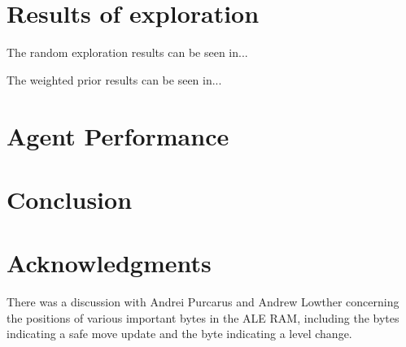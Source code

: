 \documentclass[a4paper,titlepage]{article}
\begin{document}
	
	\section{Results of exploration}
	
	The random exploration results can be seen in...
	
	
	The weighted prior results can be seen in...
	
	
	
	\section{Agent Performance}
	
	

	\section*{Conclusion}
	
	
	\section{Acknowledgments}
	
	There was a discussion with Andrei Purcarus and Andrew Lowther concerning the positions of various important bytes in the ALE RAM, including the bytes indicating a safe move update and the byte indicating a level change.
	
	
	
	
\end{document}
